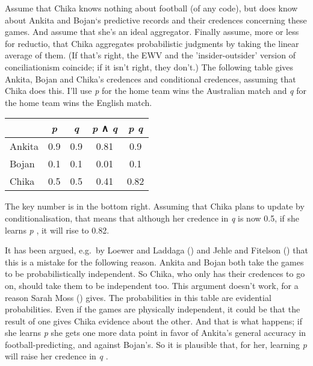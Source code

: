 \documentclass[
  10pt,
  letterpaper,
  twoside]{scrbook}
\begin{document}
Assume that {Chika} knows nothing about football (of any code), but does
know about {Ankita} and {Bojan}`s predictive records and their credences
concerning these games. And assume that she's an ideal aggregator.
Finally assume, more or less for reductio, that {Chika} aggregates
probabilistic judgments by taking the linear average of them. (If that's
right, the EWV and the 'insider-outsider' version of conciliationism
coincide; if it isn't right, they don't.) The following table gives
{Ankita}, {Bojan} and {Chika}'s credences and conditional credences,
assuming that {Chika} does this. I'll use \emph{p} for the home team
wins the Australian match and \emph{q} for the home team wins the
English match.

\begin{longtable}[]{@{}lcccc@{}}
\toprule\noalign{}
& \emph{p} & \emph{q} & \emph{p} ∧ \emph{q} & \emph{p} \textbar{}
\emph{q} \\
\midrule\noalign{}
\endhead
\bottomrule\noalign{}
\endlastfoot
Ankita & 0.9 & 0.9 & 0.81 & 0.9 \\
Bojan & 0.1 & 0.1 & 0.01 & 0.1 \\
Chika & 0.5 & 0.5 & 0.41 & 0.82 \\
\end{longtable}

The key number is in the bottom right. Assuming that {Chika} plans to
update by conditionalisation, that means that although her credence in
\emph{q} is now 0.5, if she learns \emph{p} , it will rise to 0.82.

It has been argued, e.g.~by Loewer and Laddaga
() and Jehle and Fitelson
() that this is a mistake for the
following reason. {Ankita} and {Bojan} both take the games to be
probabilistically independent. So {Chika}, who only has their credences
to go on, should take them to be independent too. This argument doesn't
work, for a reason Sarah Moss () gives. The
probabilities in this table are evidential probabilities. Even if the
games are physically independent, it could be that the result of one
gives {Chika} evidence about the other. And that is what happens; if she
learns \emph{p} she gets one more data point in favor of {Ankita}'s
general accuracy in football-predicting, and against {Bojan}'s. So it is
plausible that, for her, learning \emph{p} will raise her credence in
\emph{q} .
\end{document}

